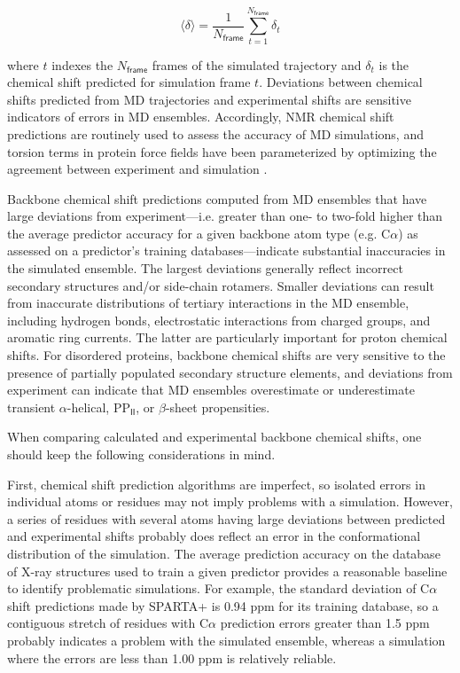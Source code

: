 \documentclass[9pt,review]{livecoms}
\begin{document}
\begin{equation}
\label{eqn:shift_estimate}
\langle \delta \rangle = \frac {1} {N_\mathsf{frame}} \sum_{t=1}^{N_{\mathsf{frame}}} \delta_t
\end{equation}

\noindent where $t$ indexes the $N_{\mathsf{frame}}$ frames of the simulated trajectory and $\delta_t$ is the chemical shift predicted for simulation frame $t$.
Deviations between chemical shifts predicted from MD trajectories and experimental shifts are sensitive indicators of errors in MD ensembles.
Accordingly, NMR chemical shift predictions are routinely used to assess the accuracy of MD simulations, and torsion terms in protein force fields have been parameterized by optimizing the agreement between experiment and simulation \cite{li_nmr-based_2010,robustelli_developing_2018}.

Backbone chemical shift predictions computed from MD ensembles that have large deviations from experiment---i.e. greater than one- to two-fold higher than the average predictor accuracy for a given backbone atom type (e.g. C$\alpha$) as assessed on a predictor’s training databases---indicate substantial inaccuracies in the simulated ensemble.
The largest deviations generally reflect incorrect secondary structures and/or side-chain rotamers.
Smaller deviations can result from inaccurate distributions of tertiary interactions in the MD ensemble, including hydrogen bonds, electrostatic interactions from charged groups, and aromatic ring currents.
The latter are particularly important for proton chemical shifts.
For disordered proteins, backbone chemical shifts are very sensitive to the presence of partially populated secondary structure elements, and deviations from experiment can indicate that MD ensembles overestimate or underestimate transient $\alpha$-helical, PP$_\mathsf{II}$, or $\beta$-sheet propensities.

When comparing calculated and experimental backbone chemical shifts, one should keep the following considerations in mind.

First, chemical shift prediction algorithms are imperfect, so isolated errors in individual atoms or residues may not imply problems with a simulation.
However, a series of residues with several atoms having large deviations between predicted and experimental shifts probably does reflect an error in the conformational distribution of the simulation.
The average prediction accuracy on the database of X-ray structures used to train a given predictor provides a reasonable baseline to identify problematic simulations.
For example, the standard deviation of C$\alpha$ shift predictions made by SPARTA+ is 0.94 ppm for its training database, so a contiguous stretch of residues with C$\alpha$ prediction errors greater than 1.5 ppm probably indicates a problem with the simulated ensemble, whereas a simulation where the errors are less than 1.00 ppm is relatively reliable.
\end{document}
